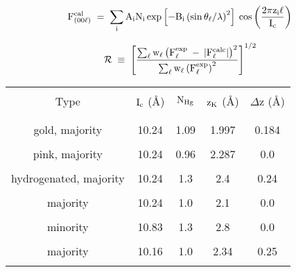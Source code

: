 {\newpage
\clearpage
\samepage \begin{equation}%
\label{stfact}
\rm F^{cal}_{(00\ell)} \; = \; \sum_i A_i N_i \exp{ \left[ -B_i \left( \sin \theta_{\ell}/ \lambda \right)^2 \right]} \: \cos \left( \frac{2 \pi z_i \ell}{I_c} \right)
\end{equation}
}

{\newpage
\clearpage
\samepage \begin{figure}\vspace{12cm}
%

\label{zeedef}
\end{figure}
}

{\newpage
\clearpage
\samepage \begin{equation}\label{hamilton}
 \cal R \rm \; \equiv \; \left[  \frac{\sum_{\ell} w_{\ell} \left( F_{\ell}^{exp} \: - \: |F_{\ell}^{calc}| \right)^2}{\sum_{\ell} w_{\ell} \left(F_{\ell}^{exp} \right)^2} \right]^{1/2}
\end{equation}
}

{\newpage
\clearpage
\samepage \begin{table}
\label{neutnum}
\begin{center}
\begin{tabular}{|ccccc|}
\hline
& & & & \\ 
Type & $\rm I_c$ (\AA) & $\rm N_{Hg}$  & $\rm z_K$ (\AA) & $\Delta$z (\AA) \\ 
& & & & \\ 
\hline
& & & & \\ 
gold, majority  & 10.24 & 1.09 & 1.997 & 0.184 \\ 
& & & & \\ 
pink, majority  & 10.24 & 0.96 & 2.287 & 0.0 \\ 
& & & & \\ 
hydrogenated, majority  & 10.24 & 1.3 & 2.4 & 0.24 \\  
& & & & \\ 
majority\cite{yang84} & 10.24 & 1.0 & 2.1 & 0.0 \\ 
& & & & \\ 
minority\cite{yang84} & 10.83 & 1.3 & 2.8 & 0.0 \\ 
& & & & \\ 
majority\cite{elmakrini80} & 10.16 & 1.0 & 2.34 & 0.25 \\ 
& & & & \\ 
\hline
\end{tabular}
\end{center}
\end{table}
}

